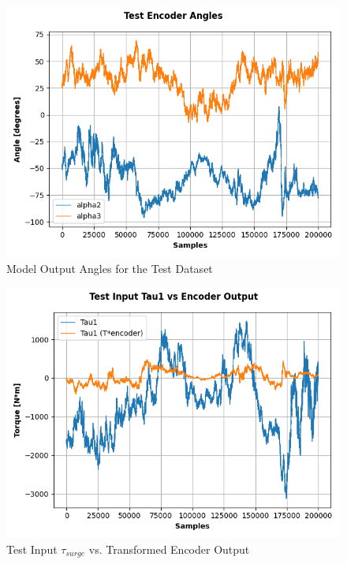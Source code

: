 \documentclass{article}
\begin{document}
\begin{figure}[H]
    \centering
    \includegraphics[scale=0.65]{../best_outputs/angles_fig.png}
    \caption{Model Output Angles for the Test Dataset}
    \label{fig:angles}
\end{figure}

\begin{figure}[H]
    \centering
    \includegraphics[scale=0.65]{../best_outputs/transform1_fig.png}
    \caption{Test Input $\tau_{surge}$ vs. Transformed Encoder Output}
    \label{fig:transform1}
\end{figure}
\end{document}

